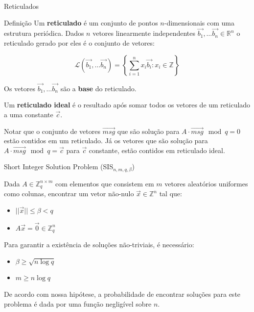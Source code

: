 \documentclass{beamer}
\begin{document}
\begin{frame}{Reticulados}

\begin{block}{Definição}
 Um \textbf{reticulado} é um conjunto de pontos $n$-dimensionais com uma estrutura periódica. Dados $n$ vetores linearmente independentes
 $\overrightarrow{b_1},\ldots\overrightarrow{b_n} \in \mathbb{R}^n$
 o reticulado gerado por eles é o conjunto de vetores:
 
 $$
 \mathcal{L}(\overrightarrow{b_1},\ldots\overrightarrow{b_n})=\left\{\sum_{i=1}^nx_i\overrightarrow{b_i}
 : x_i \in \mathbb{Z}\right\}
 $$
 
 Os vetores $\overrightarrow{b_1},\ldots\overrightarrow{b_n}$ são a
 \textbf{base} do reticulado.
 \end{block}

 Um \textbf{reticulado ideal} é o resultado após somar todos os vetores de um reticulado a uma constante $\overrightarrow{c}$.
 
 Notar que o conjunto de vetores $\overrightarrow{msg}$ que são solução para $A\cdot\overrightarrow{msg} \mod q=0$ estão contidos em um reticulado. Já os vetores que são solução para $A\cdot\overrightarrow{msg} \mod q = \overrightarrow{c}$ para $\overrightarrow{c}$ constante, estão contidos em reticulado ideal.
\end{frame}

\begin{frame}{Short Integer Solution Problem (SIS$_{n, m, q, \beta}$)}
    
Dada $A \in \mathbb{Z}_q^{n \times m}$ com elementos que consistem em
$m$ vetores aleatórios uniformes como colunas, encontrar um vetor não-nulo 
$\overrightarrow{x} \in \mathbb{Z}^n$ tal que:

\begin{itemize}
    \item $||\overrightarrow{x}||\leq \beta < q$
    \item $A\overrightarrow{x}=\overrightarrow{0} \in \mathbb{Z}_q^n$
\end{itemize}

Para garantir a existência de soluções não-triviais, é necessário:

\begin{itemize}
    \item $\beta \geq \sqrt{n\log q}$
    \item $m \geq n \log q$
\end{itemize}

De acordo com nossa hipótese, a probabilidade de encontrar soluções para este problema é dada por uma função negligível sobre $n$.
\end{frame}
\end{document}
